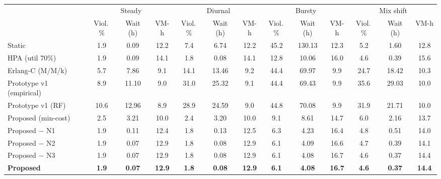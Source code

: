 \begin{tabular}{@{}lcccccccccccc@{}}
\toprule
 & \multicolumn{3}{c}{Steady} & \multicolumn{3}{c}{Diurnal} & \multicolumn{3}{c}{Bursty} & \multicolumn{3}{c}{Mix shift} \\
 & Viol.\,\% & Wait (h) & VM-h & Viol.\,\% & Wait (h) & VM-h & Viol.\,\% & Wait (h) & VM-h & Viol.\,\% & Wait (h) & VM-h \\
\midrule
Static & 1.9 & 0.09 & 12.2 & 7.4 & 6.74 & 12.2 & 45.2 & 130.13 & 12.3 & 5.2 & 1.60 & 12.8 \\
HPA (util 70\%) & 1.9 & 0.09 & 14.1 & 1.8 & 0.08 & 14.1 & 12.8 & 10.06 & 16.0 & 4.6 & 0.39 & 15.6 \\
Erlang-C (M/M/k) & 5.7 & 7.86 & 9.1 & 14.1 & 13.46 & 9.2 & 44.4 & 69.97 & 9.9 & 24.7 & 18.42 & 10.3 \\
Prototype v1 (empirical) & 8.9 & 11.10 & 9.0 & 31.0 & 25.32 & 9.1 & 44.4 & 69.43 & 9.9 & 35.6 & 29.03 & 10.0 \\
Prototype v1 (RF) & 10.6 & 12.96 & 8.9 & 28.9 & 24.59 & 9.0 & 44.8 & 70.08 & 9.9 & 31.9 & 21.71 & 10.0 \\
Proposed (min-cost) & 2.5 & 3.21 & 10.0 & 2.4 & 3.20 & 10.0 & 9.1 & 8.61 & 14.7 & 6.0 & 2.16 & 13.7 \\
Proposed $-$ N1 & 1.9 & 0.11 & 12.4 & 1.8 & 0.13 & 12.5 & 6.3 & 4.23 & 16.4 & 4.8 & 0.51 & 14.0 \\
Proposed $-$ N2 & 1.9 & 0.07 & 12.9 & 1.8 & 0.08 & 12.9 & 6.1 & 4.09 & 16.6 & 4.7 & 0.39 & 14.1 \\
Proposed $-$ N3 & 1.9 & 0.07 & 12.9 & 1.8 & 0.08 & 12.9 & 6.1 & 4.08 & 16.7 & 4.6 & 0.37 & 14.4 \\
\textbf{Proposed} & \textbf{1.9} & \textbf{0.07} & \textbf{12.9} & \textbf{1.8} & \textbf{0.08} & \textbf{12.9} & \textbf{6.1} & \textbf{4.08} & \textbf{16.7} & \textbf{4.6} & \textbf{0.37} & \textbf{14.4} \\
\bottomrule
\end{tabular}